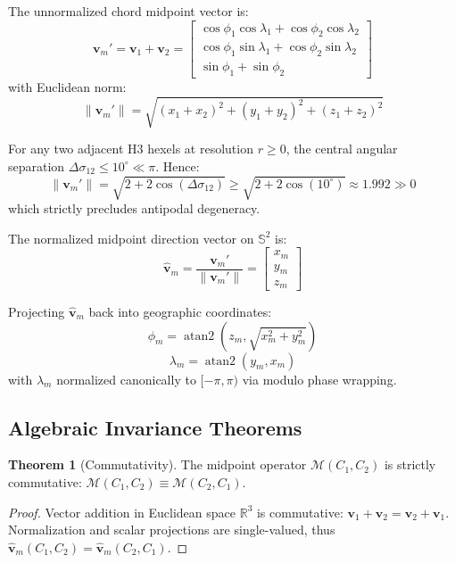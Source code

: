 \documentclass[11pt,a4paper]{article}
\theoremstyle{definition}
\newtheorem{theorem}{Theorem}
\begin{document}
The unnormalized chord midpoint vector is:
\begin{equation}
\mathbf{v}_m' = \mathbf{v}_1 + \mathbf{v}_2 = \begin{bmatrix} \cos\phi_1 \cos\lambda_1 + \cos\phi_2 \cos\lambda_2 \\ \cos\phi_1 \sin\lambda_1 + \cos\phi_2 \sin\lambda_2 \\ \sin\phi_1 + \sin\phi_2 \end{bmatrix}
\end{equation}
with Euclidean norm:
\begin{equation}
\|\mathbf{v}_m'\| = \sqrt{(x_1 + x_2)^2 + (y_1 + y_2)^2 + (z_1 + z_2)^2}
\end{equation}

For any two adjacent H3 hexels at resolution $r \ge 0$, the central angular separation $\Delta\sigma_{12} \le 10^\circ \ll \pi$. Hence:
\begin{equation}
\|\mathbf{v}_m'\| = \sqrt{2 + 2 \cos(\Delta\sigma_{12})} \ge \sqrt{2 + 2 \cos(10^\circ)} \approx 1.992 \gg 0
\end{equation}
which strictly precludes antipodal degeneracy.

The normalized midpoint direction vector on $\mathbb{S}^2$ is:
\begin{equation}
\hat{\mathbf{v}}_m = \frac{\mathbf{v}_m'}{\|\mathbf{v}_m'\|} = \begin{bmatrix} x_m \\ y_m \\ z_m \end{bmatrix}
\end{equation}

Projecting $\hat{\mathbf{v}}_m$ back into geographic coordinates:
\begin{equation}
\phi_m = \operatorname{atan2}\left(z_m, \sqrt{x_m^2 + y_m^2}\right)
\end{equation}
\begin{equation}
\lambda_m = \operatorname{atan2}\left(y_m, x_m\right)
\end{equation}
with $\lambda_m$ normalized canonically to $[-\pi, \pi)$ via modulo phase wrapping.

\subsection{Algebraic Invariance Theorems}

\begin{theorem}[Commutativity]
The midpoint operator $\mathcal{M}(C_1, C_2)$ is strictly commutative: $\mathcal{M}(C_1, C_2) \equiv \mathcal{M}(C_2, C_1)$.
\end{theorem}
\begin{proof}
Vector addition in Euclidean space $\mathbb{R}^3$ is commutative: $\mathbf{v}_1 + \mathbf{v}_2 = \mathbf{v}_2 + \mathbf{v}_1$. Normalization and scalar projections are single-valued, thus $\hat{\mathbf{v}}_m(C_1, C_2) = \hat{\mathbf{v}}_m(C_2, C_1)$.
\end{proof}
\end{document}
